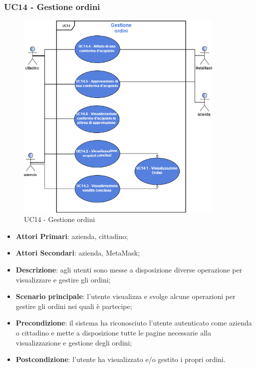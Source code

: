 \subsubsection{UC14 - Gestione ordini}
\begin{figure}[h]
	\includegraphics[width=10cm]{res/images/UC14-GestioneOrdini.png}
	\centering
	\caption{UC14 - Gestione ordini}
\end{figure}
\begin{itemize}
	\item \textbf{Attori Primari}: azienda, cittadino;
		\item \textbf{Attori Secondari}: azienda, MetaMask\glo;
	\item \textbf{Descrizione}: agli utenti sono messe a disposizione diverse operazione per visualizzare e gestire gli ordini;
	\item \textbf{Scenario principale}: l'utente visualizza e svolge alcune operazioni per gestire gli ordini nei quali è partecipe;
	\item \textbf{Precondizione}: il sistema ha riconosciuto l'utente autenticato come azienda o cittadino e mette a disposizione tutte le pagine necessarie alla visualizzazione e gestione degli ordini;
	\item \textbf{Postcondizione}: l'utente ha visualizzato e/o gestito i propri ordini.
\end{itemize} 

